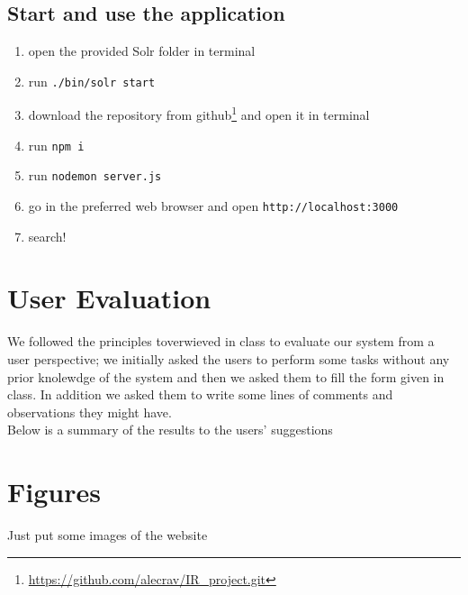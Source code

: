 \documentclass{article}
\begin{document}
\subsection{Start and use the application}
\begin{enumerate}
    \item open the provided Solr folder in terminal
    \item run \texttt{./bin/solr start}
    \item download the repository from github\footnote{\url{https://github.com/alecrav/IR_project.git}} and open it in terminal
    \item run \texttt{npm i}
    \item run \texttt{nodemon server.js}
    \item go in the preferred web browser and open \texttt{http://localhost:3000}
    \item search!
\end{enumerate}
\section{User Evaluation}
We followed the principles toverwieved in class to evaluate our system from a user perspective; we initially asked the users to perform some tasks without any prior knolewdge of the system and then we asked them to fill the form given in class. In addition we asked them to write some lines of comments and observations they might have.\\
Below is a summary of the results to the users' suggestions

\section{Figures}
Just put some images of the website
\end{document}
